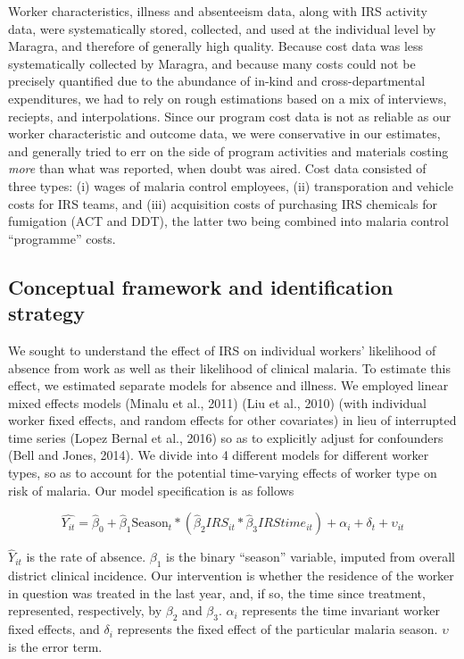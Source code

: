 \documentclass[]{article}
\begin{document}
Worker characteristics, illness and absenteeism data, along with IRS
activity data, were systematically stored, collected, and used at the
individual level by Maragra, and therefore of generally high quality.
Because cost data was less systematically collected by Maragra, and
because many costs could not be precisely quantified due to the
abundance of in-kind and cross-departmental expenditures, we had to rely
on rough estimations based on a mix of interviews, reciepts, and
interpolations. Since our program cost data is not as reliable as our
worker characteristic and outcome data, we were conservative in our
estimates, and generally tried to err on the side of program activities
and materials costing \emph{more} than what was reported, when doubt was
aired. Cost data consisted of three types: (i) wages of malaria control
employees, (ii) transporation and vehicle costs for IRS teams, and (iii)
acquisition costs of purchasing IRS chemicals for fumigation (ACT and
DDT), the latter two being combined into malaria control ``programme''
costs.

\subsection{Conceptual framework and identification
strategy}\label{conceptual-framework-and-identification-strategy}

We sought to understand the effect of IRS on individual workers'
likelihood of absence from work as well as their likelihood of clinical
malaria. To estimate this effect, we estimated separate models for
absence and illness. We employed linear mixed effects models (Minalu et
al., 2011) (Liu et al., 2010) (with individual worker fixed effects, and
random effects for other covariates) in lieu of interrupted time series
(Lopez Bernal et al., 2016) so as to explicitly adjust for confounders
(Bell and Jones, 2014). We divide into 4 different models for different
worker types, so as to account for the potential time-varying effects of
worker type on risk of malaria. Our model specification is as follows

\[
\hat{Y_{it}} = \hat{\beta}_{0} +  \hat{\beta}_{1}\text{Season}_{t} * (\hat{\beta}_2{IRS_{it}}*\hat{\beta}_3{IRStime_{it}}) + \alpha_i + \delta_t + \upsilon_{it}
\]

\(\hat{Y}_{it}\) is the rate of absence. \(\beta_{1}\) is the binary
``season'' variable, imputed from overall district clinical incidence.
Our intervention is whether the residence of the worker in question was
treated in the last year, and, if so, the time since treatment,
represented, respectively, by \(\beta_{2}\) and \(\beta_{3}\).
\(\alpha_i\) represents the time invariant worker fixed effects, and
\(\delta_i\) represents the fixed effect of the particular malaria
season. \(\upsilon\) is the error term.
\end{document}
